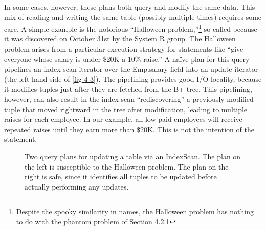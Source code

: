 \documentclass[a4paper,11pt,twoside,openright]{book}
\begin{document}
In some cases, however, these plans both query and modify the same data.
This mix of reading and writing the same table (possibly multiple times)
requires some care. A simple example is the notorious ``Halloween
problem,''\footnote{Despite the spooky similarity in names, the Halloween problem has
nothing to do with the phantom problem of Section 4.2.1} so called because it was discovered on
October 31st by the System R group. The Halloween problem arises from a
particular execution strategy for statements like ``give everyone whose
salary is under \$20K a 10\% raise.'' A na\"ive plan for this query
pipelines an index scan iterator over the Emp.salary field into an
update iterator (the left-hand side of \autoref{fig-4-3}). The pipelining
provides good I/O
locality, because it modifies tuples just after they are fetched from
the B+-tree. This pipelining, however, can also result in the index scan
``rediscovering'' a previously modified tuple that moved rightward in
the tree after modification, leading to multiple raises for each
employee. In our example, all low-paid employees will receive repeated
raises until they earn more than \$20K. This is not the intention of the
statement.

\begin{figure}
\centering
\centering
{}

\caption{Two query plans for updating a table via an IndexScan. The plan
on the left is susceptible to the Halloween problem. The plan on the
right is safe, since it identifies all tuples to be updated before
actually performing any updates.\label{fig-4-3}}
\end{figure}
\end{document}
